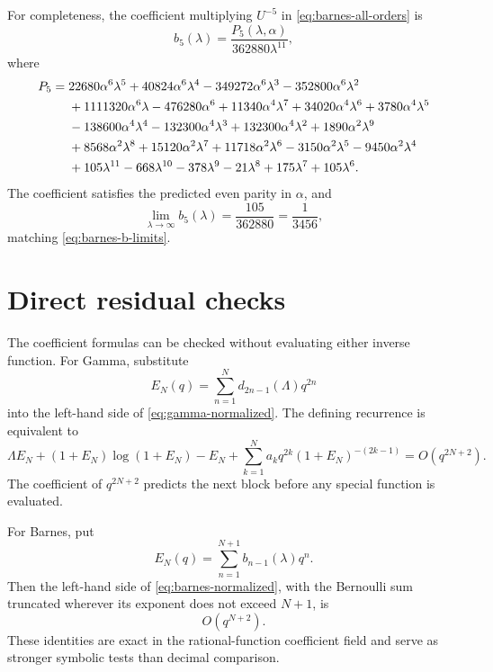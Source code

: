 \documentclass[11pt,oneside]{article}
\theoremstyle{plain}
\theoremstyle{definition}
\theoremstyle{remark}
\begin{document}
For completeness, the coefficient multiplying \(U^{-5}\) in
\cref{eq:barnes-all-orders} is
\begin{equation}
 b_5(\lambda)=\frac{P_5(\lambda,\alpha)}{362880\lambda^{11}},
 \label{eq:barnes-b5}
\end{equation}
where
\begin{align}
 P_5={}&
 22680\alpha^6\lambda^5+40824\alpha^6\lambda^4
 -349272\alpha^6\lambda^3-352800\alpha^6\lambda^2
 \notag\\
 &+1111320\alpha^6\lambda-476280\alpha^6
 +11340\alpha^4\lambda^7+34020\alpha^4\lambda^6
 +3780\alpha^4\lambda^5
 \notag\\
 &-138600\alpha^4\lambda^4-132300\alpha^4\lambda^3
 +132300\alpha^4\lambda^2
 +1890\alpha^2\lambda^9
 \notag\\
 &+8568\alpha^2\lambda^8+15120\alpha^2\lambda^7
 +11718\alpha^2\lambda^6-3150\alpha^2\lambda^5
 -9450\alpha^2\lambda^4
 \notag\\
 &+105\lambda^{11}-668\lambda^{10}-378\lambda^9
 -21\lambda^8+175\lambda^7+105\lambda^6.
 \label{eq:barnes-P5}
\end{align}
The coefficient satisfies the predicted even parity in \(\alpha\), and
\begin{equation}
 \lim_{\lambda\to\infty}b_5(\lambda)
 =\frac{105}{362880}=\frac1{3456},
 \label{eq:barnes-b5-limit}
\end{equation}
matching \cref{eq:barnes-b-limits}.

\section{Direct residual checks}
\label{app:residual-checks}

The coefficient formulas can be checked without evaluating either inverse
function.  For Gamma, substitute
\begin{equation}
 E_N(q)=\sum_{n=1}^{N}d_{2n-1}(\Lambda)q^{2n}
 \label{eq:gamma-residual-EN}
\end{equation}
into the left-hand side of \cref{eq:gamma-normalized}.  The defining recurrence
is equivalent to
\begin{equation}
 \Lambda E_N+(1+E_N)\log(1+E_N)-E_N
 +\sum_{k=1}^{N}a_kq^{2k}(1+E_N)^{-(2k-1)}
 =O(q^{2N+2}).
 \label{eq:gamma-residual-formal}
\end{equation}
The coefficient of \(q^{2N+2}\) predicts the next block before any special
function is evaluated.

For Barnes, put
\begin{equation}
 E_N(q)=\sum_{n=1}^{N+1}b_{n-1}(\lambda)q^n.
 \label{eq:barnes-residual-EN}
\end{equation}
Then the left-hand side of \cref{eq:barnes-normalized}, with the Bernoulli sum
truncated wherever its exponent does not exceed \(N+1\), is
\begin{equation}
 O(q^{N+2}).
 \label{eq:barnes-residual-formal}
\end{equation}
These identities are exact in the rational-function coefficient field and
serve as stronger symbolic tests than decimal comparison.
\end{document}
